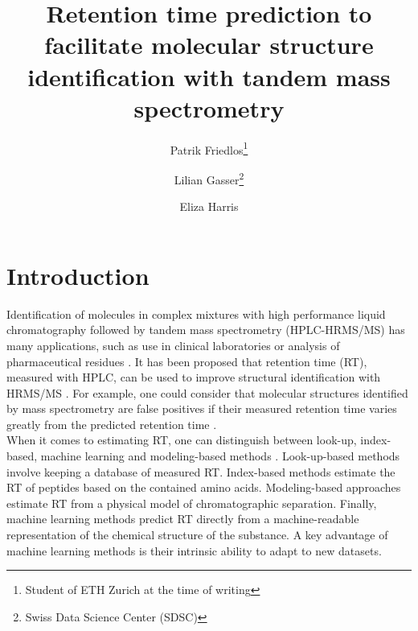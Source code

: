 \documentclass{article}
\title{Retention time prediction to facilitate molecular structure identification with tandem mass spectrometry}
\author{Patrik Friedlos\thanks{Student of ETH Zurich at the time of writing}\\
  \and Lilian Gasser\thanks{Swiss Data Science Center (SDSC)}
   \and Eliza Harris\footnotemark[2]
}
\begin{document}
\maketitle


\section{Introduction}

Identification of molecules in complex mixtures with high performance liquid chromatography followed by tandem mass spectrometry (HPLC-HRMS/MS) has many applications, such as use in clinical laboratories or analysis of pharmaceutical residues \cite{van2012role, petrovic2005liquid}. It has been proposed that retention time (RT), measured with HPLC, can be used to improve structural identification with HRMS/MS \cite{strittmatter2004application}. For example, one could consider that molecular structures identified by mass spectrometry are false positives if their measured retention time varies greatly from the predicted retention time \cite{yang2021prediction}.\\

When it comes to estimating RT, one can distinguish between look-up, index-based, machine learning and modeling-based methods \cite{moruz2017peptide}. Look-up-based methods involve keeping a database of measured RT. Index-based methods estimate the RT of peptides based on the contained amino acids. Modeling-based approaches estimate RT from a physical model of chromatographic separation. Finally, machine learning methods predict RT directly from a machine-readable representation of the chemical structure of the substance. A key advantage of machine learning methods is their intrinsic ability to adapt to new datasets.\\
\end{document}
